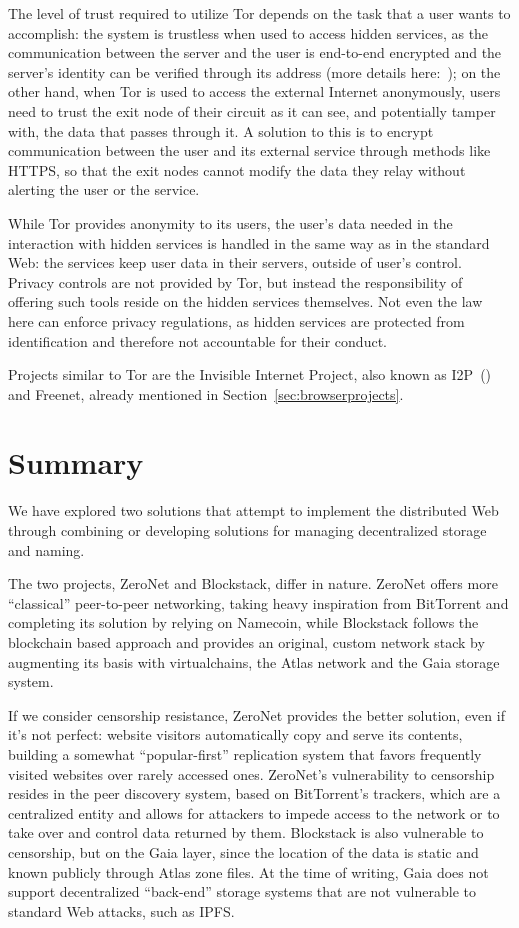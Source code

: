 \documentclass[mscthesis]{usiinfthesis}
\begin{document}
The level of trust required to utilize Tor depends on the task that a user wants to accomplish: the system is trustless when used to access hidden services, as the communication between the server and the user is end-to-end encrypted and the server's identity can be verified through its address (more details here:~\cite{website:torhiddenservice}); on the other hand, when Tor is used to access the external Internet anonymously, users need to trust the exit node of their circuit as it can see, and potentially tamper with, the data that passes through it. A solution to this is to encrypt communication between the user and its external service through methods like HTTPS, so that the exit nodes cannot modify the data they relay without alerting the user or the service.

While Tor provides anonymity to its users, the user's data needed in the interaction with hidden services is handled in the same way as in the standard Web: the services keep user data in their servers, outside of user's control. Privacy controls are not provided by Tor, but instead the responsibility of offering such tools reside on the hidden services themselves. Not even the law here can enforce privacy regulations, as hidden services are protected from identification and therefore not accountable for their conduct.

Projects similar to Tor are the Invisible Internet Project, also known as I2P~(\cite{i2p}) and Freenet, already mentioned in Section~\ref{sec:browserprojects}.

\section{Summary}

We have explored two solutions that attempt to implement the distributed Web through combining or developing solutions for managing decentralized storage and naming.

The two projects, ZeroNet and Blockstack, differ in nature. ZeroNet offers more ``classical'' peer-to-peer networking, taking heavy inspiration from BitTorrent and completing its solution by relying on Namecoin, while Blockstack follows the blockchain based approach and provides an original, custom network stack by augmenting its basis with virtualchains, the Atlas network and the Gaia storage system.

If we consider censorship resistance, ZeroNet provides the better solution, even if it's not perfect: website visitors automatically copy and serve its contents, building a somewhat ``popular-first'' replication system that favors frequently visited websites over rarely accessed ones. ZeroNet's vulnerability to censorship resides in the peer discovery system, based on BitTorrent's trackers, which are a centralized entity and allows for attackers to impede access to the network or to take over and control data returned by them.
Blockstack is also vulnerable to censorship, but on the Gaia layer,
since the location of the data is static and known publicly through Atlas zone files. At the time of writing, Gaia does not support decentralized ``back-end'' storage systems that are not vulnerable to standard Web attacks, such as IPFS.
\end{document}
